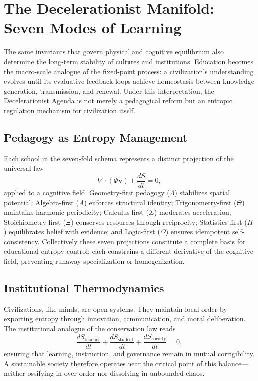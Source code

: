 \documentclass[12pt,a4paper]{article}
\begin{document}
\section{The Decelerationist Manifold: Seven Modes of Learning}

The same invariants that govern physical and cognitive equilibrium also determine the long-term stability of cultures and institutions.
Education becomes the macro-scale analogue of the fixed-point process:
a civilization’s understanding evolves until its evaluative feedback loops achieve homeostasis between knowledge generation, transmission, and renewal.
Under this interpretation, the Decelerationist Agenda is not merely a pedagogical reform but an entropic regulation mechanism for civilization itself.

\subsection{Pedagogy as Entropy Management}

Each school in the seven-fold schema represents a distinct projection of the universal law
\[
\nabla\!\cdot(\Phi\mathbf{v})+\frac{dS}{dt}=0,
\]
applied to a cognitive field.
Geometry-first pedagogy (\(\Lambda\)) stabilizes spatial potential;
Algebra-first (\(A\)) enforces structural identity;
Trigonometry-first (\(\Theta\)) maintains harmonic periodicity;
Calculus-first (\(\Sigma\)) moderates acceleration;
Stoichiometry-first (\(\Xi\)) conserves resources through reciprocity;
Statistics-first (\(\Pi\)) equilibrates belief with evidence;
and Logic-first (\(\Omega\)) ensures idempotent self-consistency.
Collectively these seven projections constitute a complete basis for educational entropy control:
each constrains a different derivative of the cognitive field, preventing runaway specialization or homogenization.

\subsection{Institutional Thermodynamics}

Civilizations, like minds, are open systems.
They maintain local order by exporting entropy through innovation, communication, and moral deliberation.
The institutional analogue of the conservation law reads
\begin{equation}
\frac{dS_{\mathrm{teacher}}}{dt} + \frac{dS_{\mathrm{student}}}{dt} + \frac{dS_{\mathrm{society}}}{dt} = 0,
\end{equation}
ensuring that learning, instruction, and governance remain in mutual corrigibility.
A sustainable society therefore operates near the critical point of this balance—neither ossifying in over-order nor dissolving in unbounded chaos.
\end{document}
